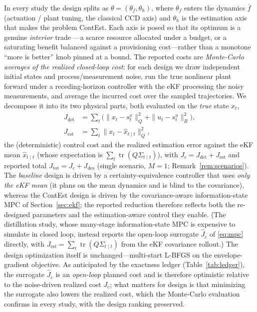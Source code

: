 \documentclass[twocolumn,amsthm]{autart}
\begin{document}
In every study the design splits as $\theta=(\theta_f,\theta_h)$, where
$\theta_f$ enters the dynamics $\bar f$ (actuation / plant tuning, the
classical CCD axis) and $\theta_h$ is the estimation axis that makes the problem
ContEst. Each axis is posed so that its optimum is a genuine \emph{interior} trade
---a scarce resource allocated under a budget, or a saturating benefit balanced
against a provisioning cost---rather than a monotone ``more is better'' knob pinned
at a bound. The reported costs are \emph{Monte-Carlo averages of the realized
closed-loop cost}: for each design we draw independent initial states and
process/measurement noise, run the true nonlinear plant forward under a
receding-horizon controller with the eKF processing the noisy measurements, and
average the incurred cost over the sampled trajectories. We decompose it into its
two physical parts, both evaluated on the \emph{true} state $x_t$,
\begin{equation}\label{eq:costsplit}
\begin{aligned}
J_{\mathrm{det}} &= \sum_{t}\!\big(\|x_t-s^x_t\|_Q^2+\|u_t-s^u_t\|_R^2\big),\\
J_{\mathrm{est}} &= \sum_{t}\|x_t-\hat x_{t\mid t}\|_Q^2,
\end{aligned}
\end{equation}
the (deterministic) control cost and the realized estimation error against the eKF
mean $\hat x_{t\mid t}$ (whose expectation is $\sum_t\operatorname{tr}(Q\Sigma_{t\mid t})$),
with $J_c=J_{\mathrm{det}}+J_{\mathrm{est}}$ and reported total
$J_{\mathrm{tot}} = J_c + J_{\mathrm{des}}$ (single scenario, $M=1$;
Remark~\ref{rem:scenarios}). The \emph{baseline} design is driven by a
certainty-equivalence controller that uses \emph{only the eKF mean} (it plans on
the mean dynamics and is blind to the covariance), whereas the ContEst design is
driven by the covariance-aware information-state MPC of Section~\ref{sec:ekf}; the
reported reduction therefore reflects both the re-designed parameters and the
estimation-aware control they enable. (The distillation study, whose many-stage
information-state MPC is expensive to simulate in closed loop, instead reports the
open-loop surrogate $\widehat J_c$ of \eqref{eq:mpc} directly, with
$J_{\mathrm{est}}=\sum_t\operatorname{tr}(Q\Sigma_{t\mid t})$ from the eKF
covariance rollout.) The design optimization itself is unchanged---multi-start
L-BFGS on the envelope-gradient objective. As anticipated by the exactness ledger
(Table~\ref{tab:ledger}), the surrogate $\widehat J_c$ is an \emph{open-loop}
planned cost and is therefore optimistic relative to the noise-driven realized cost
$J_c$; what matters for design is that minimizing the surrogate also lowers the realized
cost, which the Monte-Carlo evaluation confirms in every study, with the design
ranking preserved.
\end{document}
